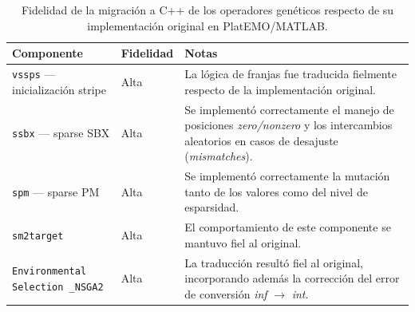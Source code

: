 \begin{table}
\centering
\footnotesize
\caption{Fidelidad de la migración a C++ de los operadores genéticos respecto de su implementación original en PlatEMO/MATLAB.}
\label{tab:fidelidad_algoritmos}
\begin{tabular}{p{5cm}p{2cm}p{6cm}}
\hline
\textbf{Componente} & \textbf{Fidelidad} & \textbf{Notas} \\
\hline
\texttt{vssps} --- inicialización stripe & Alta & La lógica de franjas fue traducida fielmente respecto de la implementación original. \\
\texttt{ssbx} --- sparse SBX & Alta & Se implementó correctamente el manejo de posiciones \textit{zero/nonzero} y los intercambios aleatorios en casos de desajuste (\textit{mismatches}). \\
\texttt{spm} --- sparse PM & Alta & Se implementó correctamente la mutación tanto de los valores como del nivel de esparsidad. \\
\texttt{sm2target} & Alta & El comportamiento de este componente se mantuvo fiel al original. \\
\texttt{Environmental Selection \_NSGA2} & Alta & La traducción resultó fiel al original, incorporando además la corrección del error de conversión \textit{inf} $\rightarrow$ \textit{int}. \\
\hline
\end{tabular}
\end{table}

